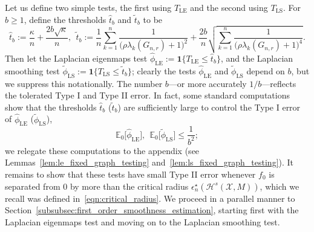 \documentclass{article}
\newcommand{\1}{\mathbf{1}}
\newcommand{\Xset}{\mathcal{X}}
\newcommand{\mc}[1]{\mathcal{#1}}
\newcommand{\Ebb}{\mathbb{E}}
\newcommand{\wt}[1]{\widetilde{#1}}
\newcommand{\wh}[1]{\widehat{#1}}
\newcommand{\LE}{\mathrm{LE}}
\newcommand{\LS}{\mathrm{LS}}
\theoremstyle{alden}
\theoremstyle{aldenthm}
\theoremstyle{definition}
\theoremstyle{remark}
\begin{document}
Let us define two simple tests, the first using $T_{\LE}$ and the second using $T_{\LS}$. For $b \geq 1$, define the thresholds $\wh{t}_b$ and $\wt{t}_b$ to be
\begin{equation*}
\wh{t}_{b} := \frac{\kappa}{n} + \frac{2b\sqrt{\kappa}}{n},~~ \wt{t}_{b} := \frac{1}{n}\sum_{k = 1}^{n} \frac{1}{\bigl(\rho \lambda_k(G_{n,r}) + 1\bigr)^2} + \frac{2b}{n}\sqrt{\sum_{k = 1}^{n} \frac{1}{\bigl(\rho \lambda_k(G_{n,r}) + 1\bigr)^4}}.
\end{equation*}
Then let the Laplacian eigenmaps test $\wh{\phi}_{\LE} := \1\bigl\{T_{\LE} \leq \wh{t}_b\bigr\}$, and the Laplacian smoothing test $\wt{\phi}_{\LS} := \1\bigl\{T_{\LS} \leq \wt{t}_b\bigr\}$; clearly the tests $\wh{\phi}_{\LE}$ and $\wt{\phi}_{\LS}$ depend on $b$, but we suppress this notationally. The number $b$---or more accurately $1/b$---reflects the tolerated Type I and Type II error. In fact, some standard computations show that the thresholds $\wh{t}_b$ ($\wt{t}_b$) are sufficiently large to control the Type I error of $\wh{\phi}_{\LE}$ ($\wt{\phi}_{\LS}$), 
\begin{equation*}
\Ebb_0\bigl[\wh{\phi}_{\LE}\bigr],~~\Ebb_0\bigl[\wt{\phi}_{\LS}\bigr] \leq \frac{1}{b^2};
\end{equation*}
we relegate these computations to the appendix (see Lemmas~\ref{lem:le_fixed_graph_testing} and~\ref{lem:ls_fixed_graph_testing}). It remains to show that these tests have small Type II error whenever $f_0$ is separated from $0$ by more than the critical radius $\epsilon_n^{\star}(\mc{H}^s(\Xset,M))$, which we recall was defined in~\eqref{eqn:critical_radius}. We proceed in a parallel manner to Section~\ref{subsubsec:first_order_smoothness_estimation}, starting first with the Laplacian eigenmaps test and moving on to the Laplacian smoothing test. 
\end{document}
